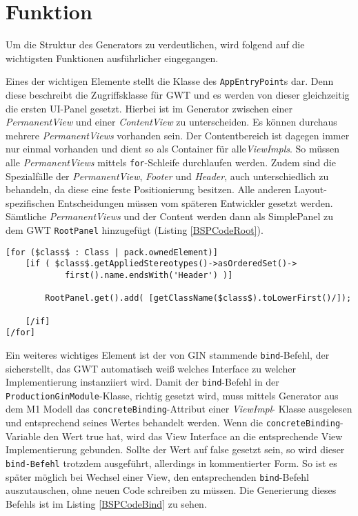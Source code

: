 \section{Funktion}\label{Funktion}
Um die Struktur des Generators zu verdeutlichen, wird folgend auf die wichtigsten Funktionen ausführlicher eingegangen.

Eines der wichtigen Elemente stellt die Klasse des \texttt{AppEntryPoint}s dar. Denn diese beschreibt die Zugriffsklasse für GWT und es werden von dieser gleichzeitig die ersten UI-Panel gesetzt. Hierbei ist im Generator zwischen einer \textit{PermanentView} und einer \textit{ContentView} zu unterscheiden. Es können durchaus mehrere \textit{PermanentViews} vorhanden sein. Der Contentbereich ist dagegen immer nur einmal vorhanden und dient so als Container für alle\textit{ViewImpls}. So müssen alle \textit{PermanentViews} mittels \texttt{for}-Schleife durchlaufen werden. Zudem sind die Spezialfälle der \textit{PermanentView}, \textit{Footer} und \textit{Header}, auch unterschiedlich zu behandeln, da diese eine feste Positionierung besitzen. Alle anderen Layout-spezifischen Entscheidungen müssen vom späteren Entwickler gesetzt werden. Sämtliche \textit{PermanentViews} und der Content werden dann als SimplePanel zu dem GWT \texttt{RootPanel} hinzugefügt (Listing \ref{BSPCodeRoot}). \\
\lstset{language=mtl}\label{BSPCodeRoot}
\begin{lstlisting}[caption={Hinzufügen eines Panels zum \texttt{RootPane}l, am Beipsiel eines \textit{Header}s}]
[for ($class$ : Class | pack.ownedElement)]
	[if ( $class$.getAppliedStereotypes()->asOrderedSet()->
			first().name.endsWith('Header') )]

		RootPanel.get().add( [getClassName($class$).toLowerFirst()/]);

	[/if]
[/for]
\end{lstlisting}
Ein weiteres wichtiges Element ist der von GIN stammende \texttt{bind}-Befehl, der sicherstellt, das GWT automatisch weiß welches Interface zu welcher Implementierung instanziiert wird.
Damit der \texttt{bind}-Befehl in der \texttt{ProductionGinModule}-Klasse, richtig gesetzt wird, muss mittels Generator aus dem M1 Modell das \texttt{concreteBinding}-Attribut einer \textit{ViewImpl}- Klasse ausgelesen und entsprechend seines Wertes behandelt werden. Wenn die \texttt{concreteBinding}-Variable den Wert true hat, wird das View Interface an die entsprechende View Implementierung gebunden. Sollte der Wert auf false gesetzt sein, so wird dieser \texttt{bind-Befehl} trotzdem ausgeführt, allerdings in kommentierter Form. So ist es später möglich bei Wechsel einer View, den entsprechenden \texttt{bind}-Befehl auszutauschen, ohne neuen Code schreiben zu müssen. Die Generierung dieses Befehls ist im Listing \ref{BSPCodeBind} zu sehen.
